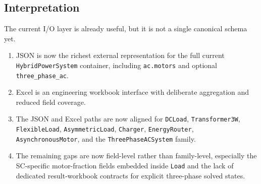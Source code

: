 \subsection{Interpretation}

The current I/O layer is already useful, but it is not a single canonical
schema yet.
\begin{enumerate}
  \item JSON is now the richest external representation for the full current \texttt{HybridPowerSystem} container, including \texttt{ac.motors} and optional \texttt{three\_phase\_ac}.
  \item Excel is an engineering workbook interface with deliberate aggregation and reduced field coverage.
  \item The JSON and Excel paths are now aligned for \texttt{DCLoad}, \texttt{Transformer3W}, \texttt{FlexibleLoad}, \texttt{AsymmetricLoad}, \texttt{Charger}, \texttt{EnergyRouter}, \texttt{AsynchronousMotor}, and the \texttt{ThreePhaseACSystem} family.
  \item The remaining gaps are now field-level rather than family-level, especially the SC-specific motor-fraction fields embedded inside \texttt{Load} and the lack of dedicated result-workbook contracts for explicit three-phase solved states.
\end{enumerate}
